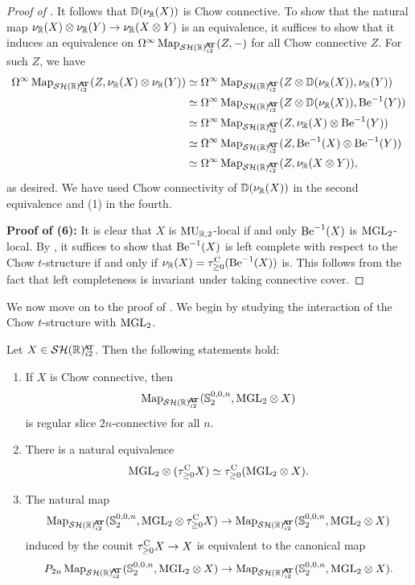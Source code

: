 \begin{proof}[Proof of ]
  It follows that $\mathbb{D}(\nu_{\mathbb{R}}(X))$ is Chow connective. To show that the natural map $\nu_{\mathbb{R}}(X) \otimes \nu_{\mathbb{R}}(Y) \to \nu_{\mathbb{R}}(X \otimes Y)$ is an equivalence, it suffices to show that it induces an equivalence on $\Omega^{\infty} \Map_{\SHRat} (Z, -)$ for all Chow connective $Z$.
  For such $Z$, we have
  \begin{align*}
    \Omega^{\infty} \Map_{\SHRat} (Z, \nur(X) \otimes \nur(Y))
    &\simeq  \Omega^{\infty} \Map_{\SHRat} (Z \otimes \mathbb{D} (\nur(X)), \nur(Y)) \\
    &\simeq \Omega^{\infty} \Map_{\SHRat} (Z \otimes \mathbb{D} (\nur(X)), \b^{-1} (Y)) \\
    &\simeq \Omega^{\infty} \Map_{\SHRat} (Z, \nur(X) \otimes \b^{-1} (Y)) \\
    &\simeq \Omega^{\infty} \Map_{\SHRat} (Z, \b^{-1} (X) \otimes \b^{-1} (Y)) \\
    &\simeq \Omega^{\infty} \Map_{\SHRat} (Z, \nur(X \otimes Y)),
  \end{align*}
  as desired. We have used Chow connectivity of $\mathbb{D} (\nu_{\mathbb{R}}(X))$ in the second equivalence and (1) in the fourth.

  \textbf{Proof of (6):} It is clear that $X$ is $\operatorname{\mathrm{MU}}_{\mathbb{R}, 2}$-local if and only $\mathrm{Be}^{-1} (X)$ is $\mathrm{MGL}_2$-local.
  By , it suffices to show that $\mathrm{Be}^{-1} (X)$ is left complete with respect to the Chow $t$-structure if and only if $\nu_{\mathbb{R}}(X) = \tau_{\geq 0} ^{\mathrm{C}} (\mathrm{Be}^{-1} (X))$ is.
  This follows from the fact that left completeness is invariant under taking connective cover.
\end{proof}

We now move on to the proof of .
We begin by studying the interaction of the Chow $t$-structure with $\mathrm{MGL}_2$.

\begin{prop} \label{prop:Chow-MGL}
  Let $X \in \SHRat$. Then the following statements hold:
  \begin{enumerate}
    \item If $X$ is Chow connective, then
      \[\Map_{\SHRat} (\Ss_2^{0,0,n}, \MGL_2 \otimes X)\]
      is regular slice $2n$-connective for all $n$.
    \item There is a natural equivalence
      \[\mathrm{MGL}_2 \otimes (\tau^{\mathrm{C}} _{\geq 0} X) \simeq \tau_{\geq 0} ^{\mathrm{C}} (\mathrm{MGL}_2 \otimes X).\]
    \item The natural map
      \[\Map_{\SHRat} (\Ss_2^{0,0,n}, \MGL_2 \otimes \tau_{\geq 0} ^{\cn} X) \to \Map_{\SHRat} (\Ss_2^{0,0,n}, \MGL_2 \otimes X)\]
      induced by the counit $\tau_{\geq 0} ^{\mathrm{C}} X \to X$ is equivalent to the canonical map
      \[P_{2n} \Map_{\SHRat} (\Ss_2^{0,0,n}, \MGL_2 \otimes X) \to \Map_{\SHRat} (\Ss_2^{0,0,n}, \MGL_2 \otimes X).\]
  \end{enumerate}
\end{prop}

